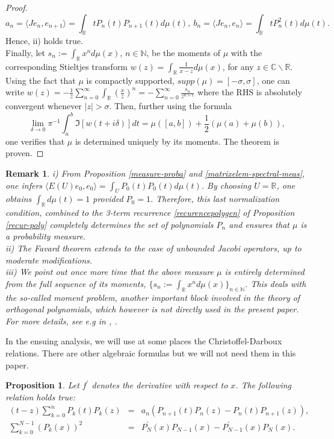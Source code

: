 \documentclass[a4paper,11pt,twoside]{article}
\numberwithin{equation}{section}
\newtheorem{proposition}[Theorem]{Proposition}
\newtheorem{remark}[Theorem]{Remark}
\theoremstyle{nonumberplain}
\newtheorem{proof}{Proof}
\newcounter{and}
\begin{document}
\begin{proof}
\begin{equation}
a_n=\langle Je_n,e_{n+1} \rangle=\int_\mathbb{R}tP_n(t)P_{n+1}(t)d\mu(t),\ b_n=\langle Je_n,e_n\rangle=\int_\mathbb{R}tP_n^2(t)d\mu(t). 
\end{equation}
Hence, ii) holds true. \\
Finally, let $s_n:=\int_\mathbb{R}x^nd\mu(x)$, $n\in\mathbb{N}$, be the moments of $\mu$ with the corresponding Stieltjes transform $w(z)=\int_\mathbb{R}\frac{1}{x-z}d\mu(x)$, for any $z\in\mathbb{C}\backslash\mathbb{R}$. Using the fact that $\mu$ is compactly supported, $supp(\mu)=[-\sigma,\sigma]$, one can write $w(z)=-\frac{1}{z}\sum_{n=0}^\infty\int_\mathbb{R}(\frac{x}{z})^n=-\sum_{n=0}^\infty\frac{s_n}{z^{n+1}}$ where the RHS is absolutely convergent whenever $|z|>\sigma$. Then, further using the formula 
\begin{equation}
\lim_{\delta\to0}\pi^{-1}\int_a^b\Im[ w(t+i\delta)]dt=\mu([a,b])+\frac{1}{2}(\mu(a)+\mu(b)), 
\end{equation}
one verifies that $\mu$ is determined uniquely by its moments. The theorem is proven.
\end{proof}
\begin{remark}
i) From Proposition \ref{measure-proba} and \ref{matrixelem-spectral-meas}, one infers $\langle E(U)e_0,e_0 \rangle=\int_UP_0(t)P_0(t)d\mu(t)$. By choosing $U=\mathbb{R}$, one obtains $\int_\mathbb{R}d\mu(t)=1$ provided $P_0=1$. Therefore, this last normalization condition, combined to the 3-term recurrence \eqref{recurencepolygen} of Proposition \ref{recur-poly} completely determines the set of polynomials $P_n$ and ensures that $\mu$ is a probability measure.\\
ii) The Favard theorem extends to the case of unbounded Jacobi operators, up to moderate modifications.\\
iii) We point out once more time that the above measure $\mu$ is entirely determined from the full sequence of its moments, $\{s_n:=\int_\mathbb{R}x^nd\mu(x) \}_{n\in\mathbb{N}}$. This deals with the so-called moment problem, another important block involved in the theory of orthogonal polynomials, which however is not directly used in the present paper. For more details, see e.g in \cite{akhiez:1965}, \cite{bsimon}.
\end{remark}
In the ensuing analysis, we will use at some places the Christoffel-Darboux relations. There are other algebraic formulas but we will not need them in this paper.
\begin{proposition}\label{chris-darb-rel}
Let $f^\prime$ denotes the derivative with respect to $x$. The following relation holds true: 
\begin{eqnarray}
(t-z)\sum_{k=0}^nP_k(t)P_k(z)&=&a_n(P_{n+1}(t)P_{n}(z)-P_{n}(t)P_{n+1}(z)),\label{christof-darb}\\
\sum_{k=0}^{N-1}(P_k(x))^2&=&P^\prime_N(x)P_{N-1}(x)-P^\prime_{N-1}(x)P_N(x)\label{christoff-darb2}.
\end{eqnarray}
\end{proposition}
\end{document}
